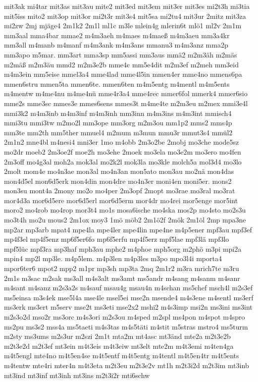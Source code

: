 {mit3ak
mi4tar
mit3as
mit3au
mite2
mit3ed
mit3em
mit3er
mit3es
mi2t3h
mi3tia
mit5iss
mito2
mit3op
mit3or
mi2t3r
mit3s4
mit5sa
mi2tu4
mit3ur
2mitz
mit3za
mi2zw
2mj
mjäge4
2m1k2
2m1l
ml1c
m3le
mlein4g
mlerin6t
mlö1
ml2v
2m1m
mm3aal
mma4bar
mmae2
m4m3aeh
m4maes
m4maeß
m4m3aeu
mm3a4kr
mm3all
m4manb
m4manf
m4m3ank
m4m3ans
mmanu3
m4m3anz
mma2p
mm3apo
m5mar.
mm3art
mma3sp
mm5assi
mm3aus
mmä2
m2m3äh
m2mäs
m2mäß
m2m3äu
mmd2
m2m3e2b
mme4c
mm5e4dit
m2m3ef
m2meh
mm3eid
m4m3ein
mm5eise
mmel3a4
mme4lad
mme4l5in
mmen4er
mme4no
mmens6pa
mmen6stru
mmen5ta
mmen6te.
mmen6ten
m4m5entg
m4mentl
m4m5ents
m4mentw
m4me4nu
m4me4nü
mme4r3a4
mme4rec
mmer6fol
mmerk4
mmer6sio
mme2s
mme3sc
mmes3e
mmes6sens
mmes3t
m4me4te
m2m3eu
m2mex
mmi3e4l
mmi3k2
m4m3inb
m4m3inf
m4m3inh
mm3inn
m4m3ins
m4m3int
mmisch4
mmi3tu
mmi3tw
m2mo2l
mm3ope
mm3org
m2m3ou
mm1p2
mms2
mms4p
mm3te
mm2th
mm5ther
mmuel4
m2mum
m3mun
mmu3r
mmut3s4
mmül2
2m1n2
mne4bl
m4nesi4
mni3er
1mo
m4obb
2m3o2be
2mobj
mo3che
mode5sz
mo2dr
moeb2
2m3oe2f
moe2h
mo3ehe
2moek
mo3ela
mo3e2m
mo3ero
mo4fen
2m3off
mo4g3al
moh2a
mok3al
mo2k2l
mok3la
mo3kle
molch5a
mol3d4
mo3lo
2molt
mom4e
mo4n3ae
mon3al
mo4n3an
mon5ato
mon3au
mo2nä
mon4das
mon4d5el
mon6d5erk
mon4din
mon4dre
mo4n3er
moni4en
moni5er.
mons2
mon3su
mont4a
2mony
mo2o
mo4per
2m3opf
2mopt
mo3rae
mo3ral
mo3rat
mor4d3a
mor6d5ere
mor6d5erl
mor6d5erm
mor4dr
mo4rei
mor5enge
mor5int
moro2
mo4rob
mo4rop
mor3t4
mo1s
mosa6ische
mo4ska
mos2p
mo4sto
mo2s3u
mo3t4h
mo2u
mous2
2m1ox
moy3
1mö
möb2
2m1ö2f
2mök
2m1öl
2mp
mpa3ne
mp2ar
mp3arb
mpat4
mpe4la
mpe4ler
mpe4lin
mpe4ne
m4p5ener
mpf3au
mpf3ef
mp4f3el
mp4f5enz
mp6f5er6fo
mp6f5erfu
mp4f5erz
mpf5lae
mpf3lä
mpf3lo
mpf5lüc
mpf3ra
mp3haf
mph3au
mphe2
m4phoe
mph5org
m2phö
m3pi
mpi2a
mpin4
mp2l
mp3le.
m4p5lem.
m4p3len
m4p3les
m3po
mpo3l4i
mporta4
mpor6ter6
mpot2
mpp2
m1pr
mp3sh
mp3ta
2mq
2m1r2
m3ra
mrich7te
m3ru
2m1s
m3sac
m2sak
ms3all
m4s3alt
ms3amt
ms5andr
m4sang
m4sanm
m4sanr
m4sant
m4sanz
m2s3a2s
m4sauf
msau4g
msau4n
m4schan
ms5chef
msch4l
m2s3ef
ms5einsa
m3s4ek
mse5l4a
mse4le
msel5ei
mse2n
msende4
m4s3ene
m4sentl
ms3erf
ms3erk
ms3ert
m5serv
mse2t
ms3eti
mse2x2
mshi2
m4s3imp
msi2n
ms3ini
ms3int
m2s3o2d
mso2r
ms3orc
m4s3ori
m2s3ou
m4sped
m2spl
ms4pon
m4spot
m4spro
ms2pu
ms3s2
mss4a
ms5taeti
m4s3tas
m4s5täti
m4stit
m5stras
mstro4
ms5turm
m2sty
ms3ums
m2s3ur
m2szi
2m1t
mta2m
mt4asc
mt3änd
mte2a
m2t3e2b
m2t3e2d
m2t3ef
mt3ein
m4t3eis
m4t3eiw
mt3elt
mte2m
m4t3emi
m4ten4ga
m4t5engl
mte4no
m4t5en4se
m4t5entf
m4t5entg
m4tentl
m4t5en4tr
m4t5ents
m4tentw
mte4ri
mter4n
m4t3eta
m2t3eu
m2t3e2v
mt1h
m2t3i2d
m2t3im
mt3inb
mt3ind
mt3inf
mt3inh
mt3ins
m2t3i2r
mti6schw
}
